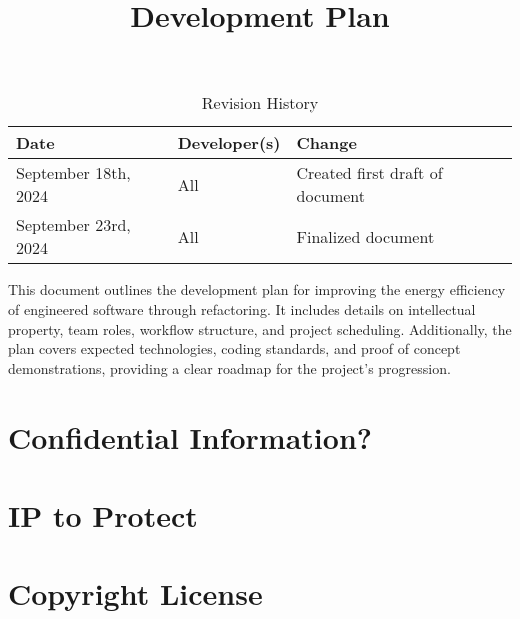 \documentclass{article}
\title{Development Plan\\\progname}
\author{\authname}
\date{}
\begin{document}
\maketitle

\begin{table}[hp]
  \caption{Revision History} \label{TblRevisionHistory}
  \begin{tabularx}{\textwidth}{llX}
    \toprule
    \textbf{Date} & \textbf{Developer(s)} & \textbf{Change}\\
    \midrule
    September 18th, 2024 & All & Created first draft of document\\
    September 23rd, 2024 & All & Finalized document\\
    \bottomrule
  \end{tabularx}
\end{table}

\newpage{}

This document outlines the development plan for improving the energy efficiency of
engineered software through refactoring. It includes details on intellectual property,
team roles, workflow structure, and project scheduling. Additionally, the plan covers
expected technologies, coding standards, and proof of concept demonstrations, providing
a clear roadmap for the project's progression.

\section{Confidential Information?}


\section{IP to Protect}


\section{Copyright License}
\end{document}
